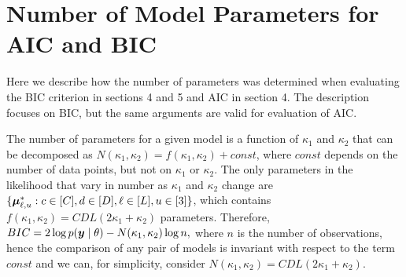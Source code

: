 \begin{enumerate}
\end{enumerate}


\section{Number of Model Parameters for AIC and BIC}
\label{sec:number_param}

Here we describe how the number of parameters was determined when
evaluating the BIC criterion in sections 4 and 5 and
AIC in section 4. The description focuses on BIC, but
the same arguments are valid for evaluation of AIC. 

The number of parameters for a given model is a function of $\kappa_1$ and
$\kappa_2$ that can be decomposed as $N(\kappa_1, \kappa_2) = f( \kappa_1,
\kappa_2) + const$, where $const$ depends on the number of data points,
but not on $\kappa_1$ or $\kappa_2$. 
The only parameters in the likelihood that vary in number as $\kappa_1$ and
$\kappa_2$ change are
$\{\mbox{\boldmath $\mu$}^*_{\ell ,u}: c\in [C], d\in [D], \ell \in [L], u \in [3] \}$,
which contains
$f(\kappa_1, \kappa_2) = CDL(2\kappa_1 + \kappa_2)$ parameters.
Therefore, $BIC = 2 \log p(\mbox{\boldmath $y$} \mid \theta) 
- N(\kappa_1, \kappa_2) \log n,$ where $n$ is the number of observations,
hence the comparison of any pair of models is invariant with respect to
the term $const$ and we can, for simplicity, consider $N(\kappa_1,
\kappa_2) = CDL(2\kappa_1 + \kappa_2)$.

